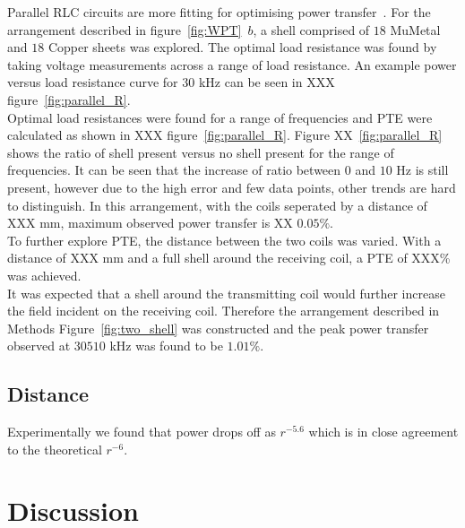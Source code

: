 \documentclass[11pt]{iopart}
\begin{document}
Parallel RLC circuits are more fitting for optimising power
transfer~\cite{XXX}. For the arrangement described in
figure~\ref{fig:WPT}~$b$, a shell comprised of $18$ MuMetal and
$18$ Copper sheets was explored. The optimal load resistance was found
by taking voltage measurements across a range of load resistance. An
example power versus load resistance curve for $30$ kHz can be seen in
XXX figure~\ref{fig:parallel_R}.\\ Optimal load resistances were found
for a range of frequencies and PTE were calculated as shown in XXX
figure~\ref{fig:parallel_R}. Figure XX~\ref{fig:parallel_R} shows the
ratio of shell present versus no shell present for the range of
frequencies. It can be seen that the increase of ratio between $0$ and
$10$ Hz is still present, however due to the high error and few data
points, other trends are hard to distinguish. In this arrangement,
with the coils seperated by a distance of XXX mm, maximum observed
power transfer is XX $0.05\%$.\\
To further explore PTE, the distance between the two coils was
varied. With a distance of XXX mm and a full shell around the
receiving coil, a PTE of XXX\% was achieved.\\
It was expected that a shell around the transmitting coil would
further increase the field incident on the receiving coil. Therefore
the arrangement described in Methods Figure~\ref{fig:two_shell} was
constructed and the peak power transfer observed at $30510$ kHz was
found to be $1.01\%$.\\


\subsection{Distance}
Experimentally we found that power drops off as $r^{-5.6}$ which is in
close agreement to the theoretical $r^{-6}$.\\

\section{Discussion}
\end{document}
